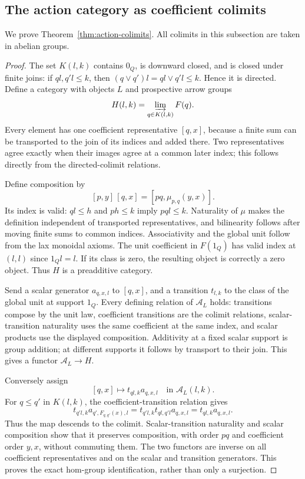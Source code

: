 \subsection{The action category as coefficient colimits}
\label{sec:action-colimits}
We prove Theorem~\ref{thm:action-colimits}. All colimits in this subsection
are taken in abelian groups.
\begin{proof}
The set $K(l,k)$ contains $0_Q$, is downward closed, and is closed under
finite joins: if $ql,q'l\leq k$, then
$(q\vee q')l=ql\vee q'l\leq k$. Hence it is directed.
Define a category with objects $L$ and prospective arrow groups
\[
 H(l,k)=\varinjlim_{q\in K(l,k)}F(q).
\]
Every element has one coefficient representative $[q,x]$, because a
finite sum can be transported to the join of its indices and added
there. Two representatives agree exactly when their images agree at a
common later index; this follows directly from the directed-colimit
relations.

Define composition by
\[
 [p,y]\,[q,x]=[pq,\mu_{p,q}(y,x)].
\]
Its index is valid: $ql\leq h$ and $ph\leq k$ imply $pql\leq k$.
Naturality of $\mu$ makes the definition independent of transported
representatives, and bilinearity follows after moving finite sums to
common indices. Associativity and the global unit follow from the lax
monoidal axioms. The unit coefficient in $F(1_Q)$ has valid index at
$(l,l)$ since $1_Ql=l$. If its class is zero, the resulting object is
correctly a zero object. Thus $H$ is a preadditive category.

Send a scalar generator $a_{q,x,l}$ to $[q,x]$, and a transition
$t_{l,k}$ to the class of the global unit at support $1_Q$.
Every defining relation of $\mathcal A_L$ holds: transitions compose
by the unit law, coefficient transitions are the colimit relations,
scalar-transition naturality uses the same coefficient at the same
index, and scalar products use the displayed composition. Additivity
at a fixed scalar support is group addition; at different supports it
follows by transport to their join. This gives a functor
$\mathcal A_L\to H$.

Conversely assign
\[
 [q,x]\longmapsto t_{ql,k}a_{q,x,l}\quad\text{in }\mathcal A_L(l,k).
\]
For $q\leq q'$ in $K(l,k)$, the coefficient-transition relation gives
\[
 t_{q'l,k}a_{q',F_{q,q'}(x),l}
 =t_{q'l,k}t_{ql,q'l}a_{q,x,l}
 =t_{ql,k}a_{q,x,l}.
\]
Thus the map descends to the colimit. Scalar-transition naturality and
scalar composition show that it preserves composition, with order
$pq$ and coefficient order $y,x$, without commuting them. The two
functors are inverse on all coefficient representatives and on the
scalar and transition generators. This proves the exact hom-group
identification, rather than only a surjection.


\end{proof}

